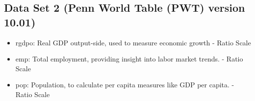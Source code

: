 \documentclass[12pt]{article}
\begin{document}
\subsection{Data Set 2 (Penn World Table (PWT) version 10.01)}
\begin{itemize}
   \item rgdpo: Real GDP output-side, used to measure economic growth - Ratio Scale
   \item emp: Total employment, providing insight into labor market trends. - Ratio Scale 
   \item pop: Population, to calculate per capita measures like GDP per capita. - Ratio Scale
\end{itemize}
\end{document}
